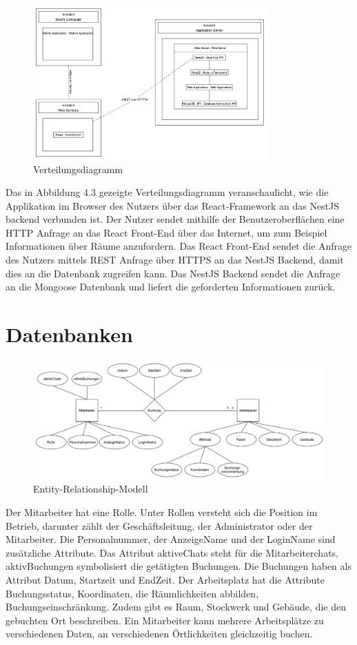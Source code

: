 \begin{figure}[!h]
    \centering
    \includegraphics[width=0.8\textwidth]{./UML_Diagrams/Verteilungsdiagramm.png}
    \caption{Verteilungsdiagramm}
    \label{fig:Verteilungsdiagramm}
\end{figure}

Das in Abbildung 4.3 gezeigte Verteilungsdiagramm veranschaulicht, wie die Applikation im Browser des Nutzers über das React-Framework an das NestJS backend verbunden ist.
Der Nutzer sendet mithilfe der Benutzeroberflächen eine HTTP Anfrage an das React Front-End über das Internet, um zum Beispiel Informationen über Räume anzufordern.
Das React Front-End sendet die Anfrage des Nutzers mittels REST Anfrage über HTTPS an das NestJS Backend, damit dies an die Datenbank zugreifen kann.
Das NestJS Backend sendet die Anfrage an die Mongoose Datenbank und liefert die geforderten Informationen zurück.

\pagebreak
\section{Datenbanken}
\begin{figure}[!h]
    \centering
    \includegraphics[width=1\textwidth]{./images/EntityRelationshipModel.png}
    \caption{Entity-Relationship-Modell}
    \label{fig:EntityRelationshipModel}
\end{figure}
Der Mitarbeiter hat eine Rolle. 
Unter Rollen versteht sich die Position im Betrieb, darunter zählt der Geschäftsleitung, der Administrator oder der Mitarbeiter.
Die Personalnummer, der AnzeigeName und der LoginName sind zusätzliche Attribute.
Das Attribut aktiveChats steht für die Mitarbeiterchats, aktivBuchungen symbolisiert die getätigten Buchungen.
Die Buchungen haben als Attribut Datum, Startzeit und EndZeit.
Der Arbeitsplatz hat die Attribute Buchungsstatus, Koordinaten, die Räumlichkeiten abbilden, Buchungseinschränkung. 
Zudem gibt es Raum, Stockwerk und Gebäude, die den gebuchten Ort beschreiben. 
Ein Mitarbeiter kann mehrere Arbeitsplätze zu verschiedenen Daten, an verschiedenen Örtlichkeiten gleichzeitig buchen. 
